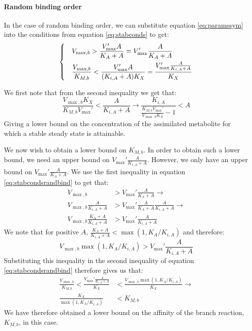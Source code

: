   \paragraph{Random binding order}
  In the case of random binding order, we can substitute equation \ref{eq:paramssym} into the conditions from equation \ref{eq:stabconds} to get:
  \begin{equation}
    \label{eq:stabcondsrandbind}
    \begin{dcases}
      & V_{\max,b}>\frac{V_{\max}'A}{K_A+A}=V_{\max}'\frac{A}{K_A+A} \\
      & \frac{V_{\max,b}}{K_{M,b}}<\frac{V_{\max}'A}{(K_{i,A}+A)K_X}=\frac{V_{\max}'\frac{A}{K_{i,A}+A}}{K_X}
    \end{dcases}
  \end{equation}

  We first note that from the second inequality we get that:
  \begin{equation}
    \label{eq:assimlowerbound}
      \frac{V_{\max,b}K_X}{K_{M,b}V_{\max}'}<\frac{A}{K_{i,A}+A} \rightarrow
      \frac{K_{i,A}}{\frac{K_{M,b}V_{\max}'}{V_{\max,b}K_X}-1}<A
  \end{equation}
  Giving a lower bound on the concentration of the assimilated metabolite for which a stable steady state is attainable.

  We now wish to obtain a lower bound on $K_{M,b}$.
  In order to obtain such a lower bound, we need an upper bound on $V_{\max}'\frac{A}{K_{i,A}+A}$.
  However, we only have an upper bound on $V_{\max}'\frac{A}{K_A+A}$.
  We use the first inequality in equation \ref{eq:stabcondsrandbind} to get that:
  \begin{equation*}
      \begin{split}
      V_{\max,b}&>V_{\max}'\frac{A}{K_A+A} \rightarrow \\
      V_{\max,b}\frac{A}{K_{i,A}+A}&>V_{\max}'\frac{A}{K_A+A}\frac{A}{K_{i,A}+A} \rightarrow \\
      V_{\max,b}\frac{K_A+A}{K_{i,A}+A}&>V_{\max}'\frac{A}{K_{i,A}+A}
      \end{split}
  \end{equation*}
  We note that for positive $A$, $\frac{K_A+A}{K_{i,A}+A} < \max(1,K_A/K_{i,A})$ and therefore:
  \begin{equation*}
      V_{\max,b}\max(1,K_A/K_{i,A})>V_{\max}'\frac{A}{K_{i,A}+A}
  \end{equation*}
  Substituting this inequality in the second inequality of equation \ref{eq:stabcondsrandbind} therefore gives us that:
  \begin{equation}
    \label{eq:randkbbound}
    \begin{split}
      \frac{V_{\max,b}}{K_{M,b}}<\frac{V_{\max}'\frac{A}{K_{i,A}+A}}{K_X}&<\frac{V_{\max,b}\max(1,K_A/K_{i,A})}{K_X} \rightarrow\\
      \frac{K_X}{\max(1,K_A/K_{i,A})}&<K_{M,b}
    \end{split}
  \end{equation}
  We have therefore obtained a lower bound on the affinity of the branch reaction, $K_{M,b}$, in this case.

